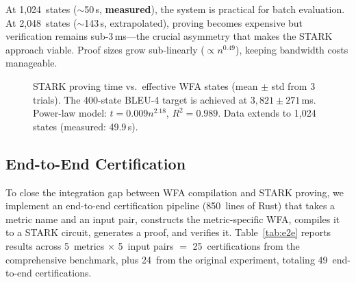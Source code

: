 \documentclass[11pt]{article}
\begin{document}
At 1{,}024~states (${\sim}$50\,s, \textbf{measured}), the system is practical for
batch evaluation.  At 2{,}048~states (${\sim}$143\,s, extrapolated), proving becomes
expensive but verification remains sub-3\,ms---the crucial asymmetry
that makes the STARK approach viable.  Proof sizes grow sub-linearly
($\propto n^{0.49}$), keeping bandwidth costs manageable.

\begin{figure}[t]
\centering
{}
\caption{STARK proving time vs.\ effective WFA states (mean $\pm$ std
  from 3 trials).  The 400-state BLEU-4 target is achieved at
  $3{,}821 \pm 271$\,ms.  Power-law model: $t = 0.009n^{2.18}$,
  $R^2 = 0.989$.  Data extends to 1{,}024 states (measured: 49.9\,s).}
\label{fig:scaling}
\end{figure}

\subsection{End-to-End Certification}\label{sec:e2e-certification}

To close the integration gap between WFA compilation and STARK proving,
we implement an end-to-end certification pipeline (850~lines of Rust)
that takes a metric name and an input pair, constructs the
metric-specific WFA, compiles it to a STARK circuit, generates a proof,
and verifies it.  Table~\ref{tab:e2e} reports results across
5~metrics $\times$ 5~input pairs $=$ 25~certifications from the
comprehensive benchmark, plus 24~from the original experiment,
totaling 49~end-to-end certifications.
\end{document}
